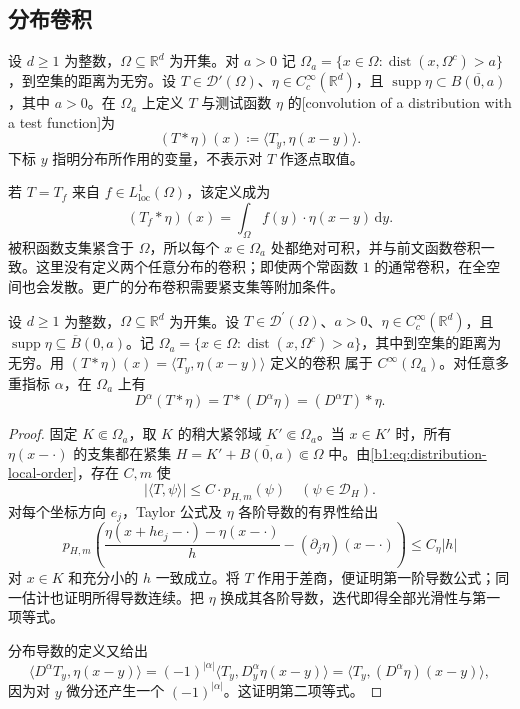 \subsection{分布卷积}
\label{b1:subsec:200302}

\begin{definition}\label{b1:def:distribution-test-convolution}
设 \(d\geq1\) 为整数，\(\Omega\subseteq\mathbb R^d\) 为开集。对 \(a>0\) 记 \(\Omega_a=\{x\in\Omega:\operatorname{dist}(x,\Omega^c)>a\}\)，到空集的距离为无穷。设 \(T\in\mathcal D'(\Omega)\)、\(\eta\in C_c^\infty(\mathbb R^d)\)，且 \(\operatorname{supp}\eta\subset\overline{B(0,a)}\)，其中 \(a>0\)。在 \(\Omega_a\) 上定义 \(T\) 与测试函数 \(\eta\) 的[convolution of a distribution with a test function]为
\[
 (T*\eta)(x)\coloneqq\langle T_y,\eta(x-y)\rangle.
\]
下标 \(y\) 指明分布所作用的变量，不表示对 \(T\) 作逐点取值。
\end{definition}

若 \(T=T_f\) 来自 \(f\in L^1_{\mathrm{loc}}(\Omega)\)，该定义成为
\[
 (T_f*\eta)(x)=\int_\Omega f(y)\cdot\eta(x-y)\,\mathrm dy.
\]
被积函数支集紧含于 \(\Omega\)，所以每个 \(x\in\Omega_a\) 处都绝对可积，并与前文函数卷积一致。这里没有定义两个任意分布的卷积；即使两个常函数 \(1\) 的通常卷积，在全空间也会发散。更广的分布卷积需要紧支集等附加条件。

\begin{proposition}\label{b1:prop:distribution-convolution-smooth}
设 \(d\geq1\) 为整数，\(\Omega\subseteq\mathbb R^d\) 为开集。设 \(T\in\mathcal D^{\prime}(\Omega)\)、\(a>0\)、\(\eta\in C_c^\infty(\mathbb R^d)\)，且 \(\operatorname{supp}\eta\subseteq\overline B(0,a)\)。记 \(\Omega_a=\{x\in\Omega:\operatorname{dist}(x,\Omega^c)>a\}\)，其中到空集的距离为无穷。用 \((T*\eta)(x)=\langle T_y,\eta(x-y)\rangle\) 定义的卷积 属于 \(C^\infty(\Omega_a)\)。对任意多重指标 \(\alpha\)，在 \(\Omega_a\) 上有
\[
 D^\alpha(T*\eta)=T*(D^\alpha\eta)=(D^\alpha T)*\eta.
\]
\end{proposition}
\begin{proof}
固定 \(K\Subset\Omega_a\)，取 \(K\) 的稍大紧邻域 \(K'\Subset\Omega_a\)。当 \(x\in K'\) 时，所有 \(\eta(x-\cdot)\) 的支集都在紧集 \(H=K'+\overline{B(0,a)}\Subset\Omega\) 中。由\eqref{b1:eq:distribution-local-order}，存在 \(C,m\) 使
\[
 |\langle T,\psi\rangle|\le C\cdot p_{H,m}(\psi)
 \quad(\psi\in\mathcal D_H).
\]
对每个坐标方向 \(e_j\)，Taylor 公式及 \(\eta\) 各阶导数的有界性给出
\[
 p_{H,m}\left(
 \frac{\eta(x+he_j-\cdot)-\eta(x-\cdot)}h
 -(\partial_j\eta)(x-\cdot)\right)\le C_\eta|h|
\]
对 \(x\in K\) 和充分小的 \(h\) 一致成立。将 \(T\) 作用于差商，便证明第一阶导数公式；同一估计也证明所得导数连续。把 \(\eta\) 换成其各阶导数，迭代即得全部光滑性与第一项等式。

分布导数的定义又给出
\[
 \langle D^\alpha T_y,\eta(x-y)\rangle
 =(-1)^{|\alpha|}\langle T_y,D_y^\alpha\eta(x-y)\rangle
 =\langle T_y,(D^\alpha\eta)(x-y)\rangle,
\]
因为对 \(y\) 微分还产生一个 \((-1)^{|\alpha|}\)。这证明第二项等式。
\end{proof}

